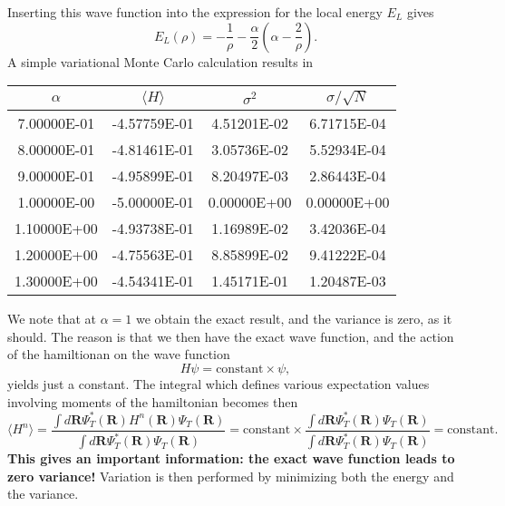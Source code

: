 \documentclass[graybox,sectrefs,envcountresetchap,open=right]{svmonodo}
\begin{document}
Inserting this wave function into the expression for the
local energy $E_L$ gives
\[
   E_L(\rho)=-\frac{1}{\rho}-
              \frac{\alpha}{2}\left(\alpha-\frac{2}{\rho}\right).
\]
A simple variational Monte Carlo calculation results in


{\small   %

\vspace{4mm}

\begin{tabular}{cccc}
\hline
\multicolumn{1}{c}{ $\alpha$ } & \multicolumn{1}{c}{ $\langle H \rangle $ } & \multicolumn{1}{c}{ $\sigma^2$ } & \multicolumn{1}{c}{ $\sigma/\sqrt{N}$ } \\
\hline
7.00000E-01 & -4.57759E-01         & 4.51201E-02 & 6.71715E-04       \\
8.00000E-01 & -4.81461E-01         & 3.05736E-02 & 5.52934E-04       \\
9.00000E-01 & -4.95899E-01         & 8.20497E-03 & 2.86443E-04       \\
1.00000E-00 & -5.00000E-01         & 0.00000E+00 & 0.00000E+00       \\
1.10000E+00 & -4.93738E-01         & 1.16989E-02 & 3.42036E-04       \\
1.20000E+00 & -4.75563E-01         & 8.85899E-02 & 9.41222E-04       \\
1.30000E+00 & -4.54341E-01         & 1.45171E-01 & 1.20487E-03       \\
\hline
\end{tabular}

\vspace{4mm}

}


\noindent




We note that at $\alpha=1$ we obtain the exact
result, and the variance is zero, as it should. The reason is that 
we then have the exact wave function, and the action of the hamiltionan
on the wave function
\[
   H\psi = \mathrm{constant}\times \psi,
\]
yields just a constant. The integral which defines various 
expectation values involving moments of the hamiltonian becomes then
\[
   \langle H^n \rangle =
   \frac{\int d\bm{R}\Psi^{\ast}_T(\bm{R})H^n(\bm{R})\Psi_T(\bm{R})}
        {\int d\bm{R}\Psi^{\ast}_T(\bm{R})\Psi_T(\bm{R})}=
\mathrm{constant}\times\frac{\int d\bm{R}\Psi^{\ast}_T(\bm{R})\Psi_T(\bm{R})}
        {\int d\bm{R}\Psi^{\ast}_T(\bm{R})\Psi_T(\bm{R})}=\mathrm{constant}.
\]
\textbf{This gives an important information: the exact wave function leads to zero variance!}
Variation is then performed by minimizing both the energy and the variance.
\end{document}
